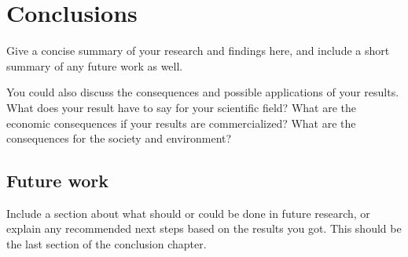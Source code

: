 \chapter{Conclusions}

Give a concise summary of your research and findings here, and include a short summary of any future work as well.

You could also discuss the consequences and possible applications of your results. What does your result have to say for your scientific field? What are the economic consequences if your results are commercialized? What are the consequences for the society and environment?

\section{Future work}

Include a section about what should or could be done in future research, or explain any recommended next steps based on the results you got. This should be the last section of the conclusion chapter.